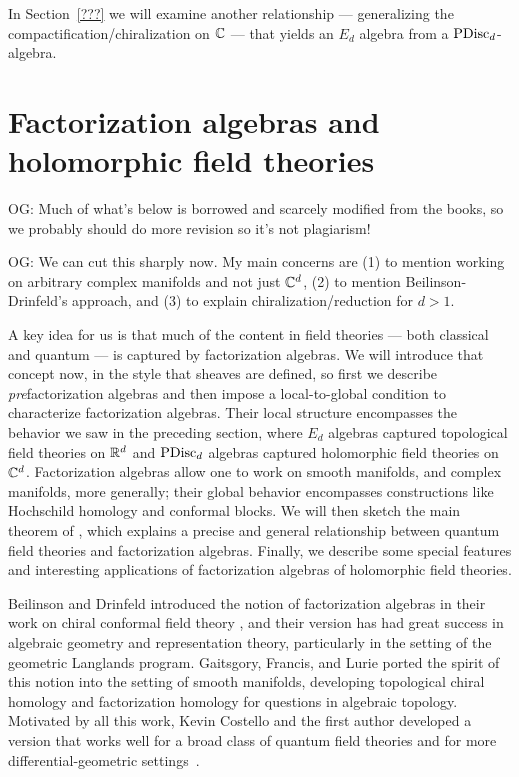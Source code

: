 \documentclass[11pt]{amsart}
\def\owen#1{{\textcolor{violet!65!black}{OG: {#1}}}}
\begin{document}
In Section~\ref{???} we will examine another relationship --- generalizing the compactification/chiralization on $\mathbb C$ --- that yields an $E_d$ algebra from a ${\rm PDisc}_d$-algebra.


\section{Factorization algebras and holomorphic field theories}
\label{prefactorization_algebras}

\owen{Much of what's below is borrowed and scarcely modified from the books, so we probably should do more revision so it's not plagiarism!}

\owen{We can cut this sharply now. My main concerns are (1) to mention working on arbitrary complex manifolds and not just $\mathbb C^d$, (2) to mention Beilinson-Drinfeld's approach, and (3) to explain chiralization/reduction for $d > 1$.}

A key idea for us is that much of the content in field theories --- both classical and quantum --- is captured by factorization algebras.
We will introduce that concept now, in the style that sheaves are defined, so first we describe {\em pre}\/factorization algebras and then impose a local-to-global condition to characterize factorization algebras.
Their local structure encompasses the behavior we saw in the preceding section, where $E_d$ algebras captured topological field theories on $\mathbb R^d$ and ${\rm PDisc}_d$ algebras captured holomorphic field theories on~$\mathbb C^d$.
Factorization algebras allow one to work on smooth manifolds, and complex manifolds, more generally;
their global behavior encompasses constructions like Hochschild homology and conformal blocks.
We will then sketch the main theorem of \cite{CG2}, 
which explains a precise and general relationship between quantum field theories and factorization algebras.
Finally, we describe some special features and interesting applications of factorization algebras of holomorphic field theories.

\begin{rmk}
Beilinson and Drinfeld introduced the notion of factorization algebras in their work on chiral conformal field theory \cite{BD},
and their version has had great success in algebraic geometry and representation theory,
particularly in the setting of the geometric Langlands program.
Gaitsgory, Francis, and Lurie ported the spirit of this notion into the setting of smooth manifolds,
developing topological chiral homology \cite{LurieHA} and factorization homology \cite{AF}
for questions in algebraic topology.
Motivated by all this work, Kevin Costello and the first author developed a version that works well for a broad class of quantum field theories and for more differential-geometric settings~\cite{CG1,CG2}.
\end{rmk}
\end{document}
